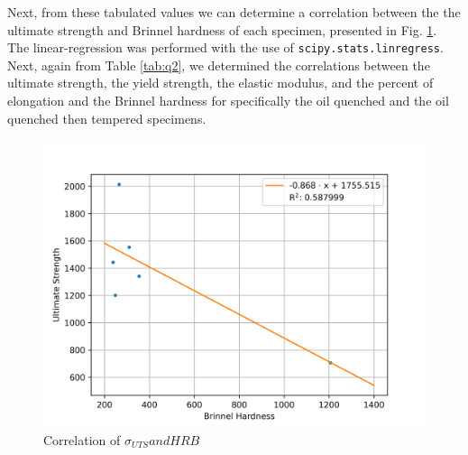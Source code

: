 \documentclass{article}
\begin{document}
Next, from these tabulated values we can determine a correlation between the  the ultimate strength and Brinnel hardness of each specimen, presented in Fig. \ref{fig:q4}. The linear-regression was performed with the use of \texttt{scipy.stats.linregress}. Next, again from Table \ref{tab:q2}, we determined the correlations between the ultimate strength, the yield strength, the elastic modulus, and the percent of elongation and the Brinnel hardness for specifically the oil quenched and the oil quenched then tempered specimens.

\begin{figure}[!h!]
    \centering
    \includegraphics[width=0.5\linewidth]{plots/q4.png}
    \caption{Correlation of $\sigma_{UTS} and HRB$}
    \label{fig:q4}
\end{figure}
\end{document}
